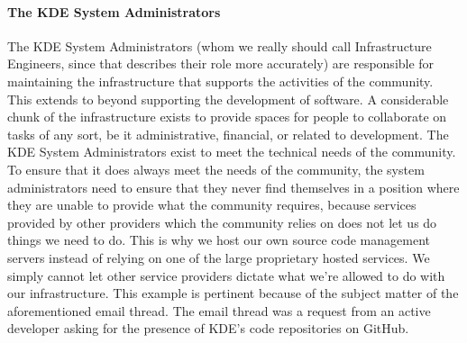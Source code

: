 \paragraph{The KDE System Administrators}
The KDE System Administrators (whom we really should call Infrastructure Engineers, since that describes their role more accurately) are responsible for maintaining the infrastructure that supports the activities of the community. This extends to beyond supporting the development of software. A considerable chunk of the infrastructure exists to provide spaces for people to collaborate on tasks of any sort, be it administrative, financial, or related to development. The KDE System Administrators exist to meet the technical needs of the community.
To ensure that it does always meet the needs of the community, the system administrators need to ensure that they never find themselves in a position where they are unable to provide what the community requires, because services provided by other providers which the community relies on does not let us do things we need to do. This is why we host our own source code management servers instead of relying on one of the large proprietary hosted services. We simply cannot let other service providers dictate what we’re allowed to do with our infrastructure.
This example is pertinent because of the subject matter of the aforementioned email thread. The email thread was a request from an active developer asking for the presence of KDE’s code repositories on GitHub.

